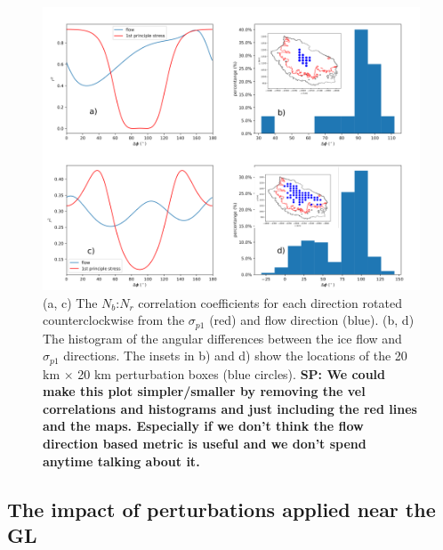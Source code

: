 \documentclass[review,oneside]{igs}
\begin{document}
\begin{figure}
	\centering
    \includegraphics[width=1\linewidth]{figs/larsenc_r2_all_direction.pdf}
    \caption{(a, c) The $N_b$:$N_r$ correlation coefficients for each direction rotated counterclockwise from the $\sigma_{p1}$ (red) and flow direction (blue). (b, d) The histogram of the angular differences between the ice flow and $\sigma_{p1}$ directions. The insets in b) and d) show the locations of the 20 km $\times$ 20 km perturbation boxes (blue circles). \textbf{SP: We could make this plot simpler/smaller by removing the vel correlations and histograms and just including the red lines and the maps. Especially if we don't think the flow direction based metric is useful and we don't spend anytime talking about it.}}
	\label{larsenc_r2_all_direction}
\end{figure}

\subsection{The impact of perturbations applied near the GL}
\end{document}
